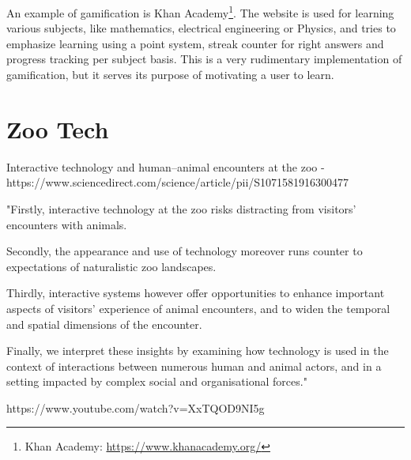     An example of gamification is Khan Academy\footnote{Khan Academy: \url{https://www.khanacademy.org/}}. The website is used for learning various subjects, like mathematics, electrical engineering or Physics, and tries to emphasize learning using a point system, streak counter for right answers and progress tracking per subject basis\cite{khanacademyGamfication}. This is a very rudimentary implementation of gamification, but it serves its purpose of motivating a user to learn\cite{khanacademyGamfication}.
    
\section{Zoo Tech}
Interactive technology and human–animal encounters at the zoo - https://www.sciencedirect.com/science/article/pii/S1071581916300477

"Firstly, interactive technology at the zoo risks distracting from visitors' encounters with animals.

Secondly, the appearance and use of technology moreover runs counter to expectations of naturalistic zoo landscapes. 

Thirdly, interactive systems however offer opportunities to enhance important aspects of visitors' experience of animal encounters, and to widen the temporal and spatial dimensions of the encounter. 

Finally, we interpret these insights by examining how technology is used in the context of interactions between numerous human and animal actors, and in a setting impacted by complex social and organisational forces."

https://www.youtube.com/watch?v=XxTQOD9NI5g

